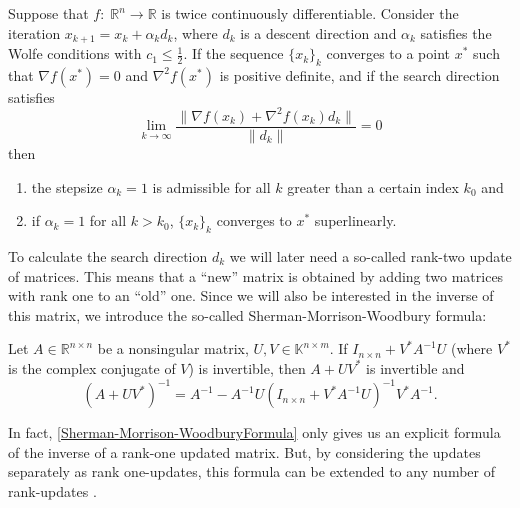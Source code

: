 \begin{theorem} \label{DennisMoreCondition}
    Suppose that $f \colon \; \mathbb{R}^n \to \mathbb{R}$ is twice continuously differentiable. Consider the iteration $x_{k+1} = x_k + \alpha_k d_k$, where $d_k$ is a descent direction and $\alpha_k$ satisfies the Wolfe conditions with $c_1 \leq \frac{1}{2}$. If the sequence $\{x_k\}_k$ converges to a point $x^*$ such that $\nabla f(x^*) = 0$ and $\nabla^2 f(x^*)$ is positive definite, and if the search direction satisfies
    \begin{equation}\label{DennisMoreLimit1}
        \lim\limits_{k \rightarrow \infty}{\frac{\lVert \nabla f(x_k) + \nabla^2 f(x_k)d_k \rVert}{\lVert d_k \rVert}} = 0
    \end{equation}
    then
    \begin{enumerate}
        \item the stepsize $\alpha_k = 1$ is admissible for all $k$ greater than a certain index $k_0$ and
        \item if $\alpha_k = 1$ for all $k>k_0$, $\{x_k\}_k$ converges to $x^*$ superlinearly.
    \end{enumerate}
\end{theorem} 

To calculate the search direction $d_k$ we will later need a so-called rank-two update of matrices. This means that a “new” matrix is obtained by adding two matrices with rank one to an “old” one. Since we will also be interested in the inverse of this matrix, we introduce the so-called Sherman-Morrison-Woodbury formula:

\begin{theorem} 
    Let $A \in \mathbb{R}^{n \times n}$ be a nonsingular matrix, $U, V \in \mathbb{K}^{n \times m}$. If $I_{n \times n} + V^* A^{-1} U$ (where $V^*$ is the complex conjugate of $V$) is invertible, then $A + U V^*$ is invertible and
    \begin{equation}\label{Sherman-Morrison-WoodburyFormula}
        (A + U V^*)^{-1} = A^{-1} - A^{-1} U (I_{n \times n} + V^* A^{-1} U)^{-1} V^* A^{-1}.
    \end{equation}
\end{theorem} 

In fact, \cref{Sherman-Morrison-WoodburyFormula} only gives us an explicit formula of the inverse of a rank-one updated matrix. But, by considering the updates separately as rank one-updates, this formula can be extended to any number of rank-updates \cite[p.~70]{UlbrichUlbrich:2012}.
